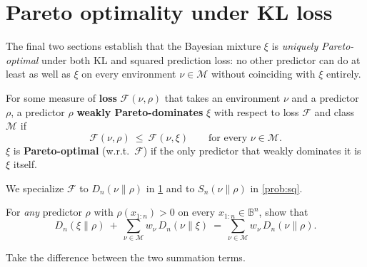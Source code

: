 \documentclass[fontsize=11pt, parskip=half]{scrartcl}
\newcommand{\Mc}{\mathcal{M}}
\newcommand{\Sn}[2]{S_{n}(#1 \parallel #2)}
\begin{document}
\section{Pareto optimality under KL loss}\label{prob:kl}

The final two sections establish that the Bayesian mixture $\xi$ is
\emph{uniquely Pareto-optimal} under both KL and squared prediction loss:
no other predictor can do at least as well as $\xi$ on every environment
$\nu \in \Mc$ without coinciding with $\xi$ entirely. 


\begin{definition}\label{def:pareto}
For some measure of \textbf{loss} $\mathcal F(\nu, \rho)$ that takes an environment $\nu$ and a
predictor $\rho$, a predictor $\rho$ \textbf{weakly Pareto-dominates} $\xi$  with respect to 
loss $\mathcal{F}$ and class $\mathcal{M}$ if
\[
  \mathcal F(\nu, \rho) ~\leq~ \mathcal F(\nu, \xi)
  \qquad \text{for every } \nu \in \Mc.
\]
$\xi$ is \textbf{Pareto-optimal} (w.r.t.\ $\mathcal F$) if the only predictor
that weakly dominates it is $\xi$ itself.

We specialize $\mathcal F$ to $D_n(\nu \parallel \rho)$ in \cref{prob:kl} 
and to $\Sn{\nu}{\rho}$ in \cref{prob:sq}.
\end{definition}


\begin{exercise}
\label{prob:kl_pythag}



For \emph{any} predictor $\rho$ with $\rho(x_{1:n}) > 0$ on every $x_{1:n} \in \mathbb{B}^n$, show that
\[
  D_n(\xi \parallel \rho) ~+~ \sum_{\nu \in \Mc} w_\nu \, D_n(\nu \parallel \xi)
  ~=~ \sum_{\nu \in \Mc} w_\nu \, D_n(\nu \parallel \rho).
\]


\begin{hint}
Take the difference between the two summation terms.
\end{hint}
\end{exercise}
\end{document}
